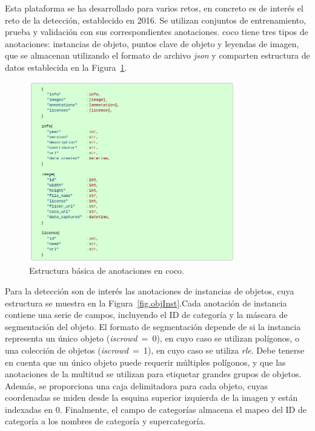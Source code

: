 Esta plataforma se ha desarrollado para varios retos, en concreto es de interés el reto de la detección, establecido en 2016. Se utilizan conjuntos de entrenamiento, prueba y validación con sus correspondientes anotaciones. \acrshort{coco} tiene tres tipos de anotaciones: instancias de objeto, puntos clave de objeto y leyendas de imagen, que se almacenan utilizando el formato de archivo \textit{\acrfull{json}} y comparten estructura de datos establecida en la Figura~\ref{fig.basicStruc}. \\

\begin{figure}[H]
	\begin{center}
		\includegraphics[width=0.8\textwidth]{figures/basic_structure_annotations.png}
		\caption{Estructura básica de anotaciones en \acrshort{coco}.}
		\label{fig.basicStruc}
	\end{center}
\end{figure} 

Para la detección son de interés las anotaciones de instancias de objetos, cuya estructura se muestra en la Figura~\ref{fig.objInst}.Cada anotación de instancia contiene una serie de campos, incluyendo el ID de categoría y la máscara de segmentación del objeto. El formato de segmentación depende de si la instancia representa un único objeto (\textit{iscrowd}~=~0), en cuyo caso se utilizan polígonos, o una colección de objetos (\textit{iscrowd}~=~1), en cuyo caso se utiliza \textit{\acrfull{rle}}. Debe tenerse en cuenta que un único objeto puede requerir múltiples polígonos, y que las anotaciones de la multitud se utilizan para etiquetar grandes grupos de objetos. Además, se proporciona una caja delimitadora para cada objeto, cuyas coordenadas se miden desde la esquina superior izquierda de la imagen y están indexadas en 0. Finalmente, el campo de categorías  almacena el mapeo del ID de categoría a los nombres de categoría y supercategoría.\\


